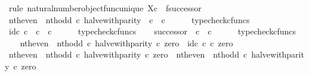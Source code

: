 \begin{isabellebody}
%
\isadelimproof
%
\endisadelimproof
%
\isatagproof
{}\isamarkupfalse%
\ {\isacharparenleft}{\kern0pt}rule\ natural{\isacharunderscore}{\kern0pt}number{\isacharunderscore}{\kern0pt}object{\isacharunderscore}{\kern0pt}func{\isacharunderscore}{\kern0pt}unique{\isacharbrackleft}{\kern0pt}\ X{\isacharequal}{\kern0pt}{\isachardoublequoteopen}{\isasymnat}\isactrlsub c{\isachardoublequoteclose}{\isacharcomma}{\kern0pt}\ \ f{\isacharequal}{\kern0pt}{\isachardoublequoteopen}successor{\isachardoublequoteclose}{\isacharbrackright}{\kern0pt}{\isacharparenright}{\kern0pt}\isanewline
\ \ \isamarkupfalse%
\ {\isachardoublequoteopen}nth{\isacharunderscore}{\kern0pt}even\ {\isasymamalg}\ nth{\isacharunderscore}{\kern0pt}odd\ {\isasymcirc}\isactrlsub c\ halve{\isacharunderscore}{\kern0pt}with{\isacharunderscore}{\kern0pt}parity\ {\isacharcolon}{\kern0pt}\ {\isasymnat}\isactrlsub c\ {\isasymrightarrow}\ {\isasymnat}\isactrlsub c{\isachardoublequoteclose}\isanewline
\ \ \ \ \isamarkupfalse%
\ typecheck{\isacharunderscore}{\kern0pt}cfuncs\isanewline
\ \ \isamarkupfalse%
\ {\isachardoublequoteopen}id\isactrlsub c\ {\isasymnat}\isactrlsub c\ {\isacharcolon}{\kern0pt}\ {\isasymnat}\isactrlsub c\ {\isasymrightarrow}\ {\isasymnat}\isactrlsub c{\isachardoublequoteclose}\isanewline
\ \ \ \ \isamarkupfalse%
\ typecheck{\isacharunderscore}{\kern0pt}cfuncs\isanewline
\ \ \isamarkupfalse%
\ {\isachardoublequoteopen}successor\ {\isacharcolon}{\kern0pt}\ {\isasymnat}\isactrlsub c\ {\isasymrightarrow}\ {\isasymnat}\isactrlsub c{\isachardoublequoteclose}\isanewline
\ \ \ \ \isamarkupfalse%
\ typecheck{\isacharunderscore}{\kern0pt}cfuncs\isanewline
\isanewline
\ \ \isamarkupfalse%
\ {\isachardoublequoteopen}{\isacharparenleft}{\kern0pt}nth{\isacharunderscore}{\kern0pt}even\ {\isasymamalg}\ nth{\isacharunderscore}{\kern0pt}odd\ {\isasymcirc}\isactrlsub c\ halve{\isacharunderscore}{\kern0pt}with{\isacharunderscore}{\kern0pt}parity{\isacharparenright}{\kern0pt}\ {\isasymcirc}\isactrlsub c\ zero\ {\isacharequal}{\kern0pt}\ id\isactrlsub c\ {\isasymnat}\isactrlsub c\ {\isasymcirc}\isactrlsub c\ zero{\isachardoublequoteclose}\isanewline
\ \ \isamarkupfalse%
\ {\isacharminus}{\kern0pt}\isanewline
\ \ \ \ \isamarkupfalse%
\ {\isachardoublequoteopen}{\isacharparenleft}{\kern0pt}nth{\isacharunderscore}{\kern0pt}even\ {\isasymamalg}\ nth{\isacharunderscore}{\kern0pt}odd\ {\isasymcirc}\isactrlsub c\ halve{\isacharunderscore}{\kern0pt}with{\isacharunderscore}{\kern0pt}parity{\isacharparenright}{\kern0pt}\ {\isasymcirc}\isactrlsub c\ zero\ {\isacharequal}{\kern0pt}\ nth{\isacharunderscore}{\kern0pt}even\ {\isasymamalg}\ nth{\isacharunderscore}{\kern0pt}odd\ {\isasymcirc}\isactrlsub c\ halve{\isacharunderscore}{\kern0pt}with{\isacharunderscore}{\kern0pt}parity\ {\isasymcirc}\isactrlsub c\ zero{\isachardoublequoteclose}\isanewline

\end{isabellebody}
